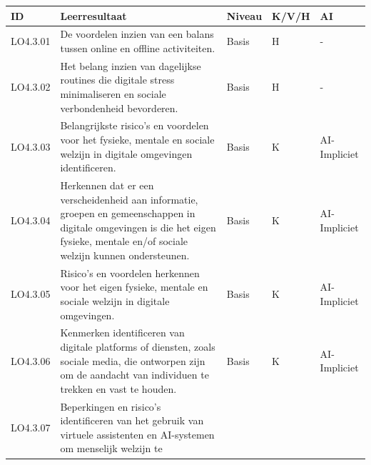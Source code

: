 \documentclass[
  dutch,
  letterpaper,
  DIV=11,
  numbers=noendperiod]{scrartcl}
\begin{document}
\begin{longtable}[]{@{}
  >{\centering\arraybackslash}p{}
  >{\centering\arraybackslash}p{}
  >{\centering\arraybackslash}p{}
  >{\centering\arraybackslash}p{}
  >{\centering\arraybackslash}p{}@{}}
\toprule\noalign{}
\begin{minipage}[b]{\linewidth}\centering
ID
\end{minipage} & \begin{minipage}[b]{\linewidth}\centering
Leerresultaat
\end{minipage} & \begin{minipage}[b]{\linewidth}\centering
Niveau
\end{minipage} & \begin{minipage}[b]{\linewidth}\centering
K/V/H
\end{minipage} & \begin{minipage}[b]{\linewidth}\centering
AI
\end{minipage} \\
\midrule\noalign{}
\endhead
\bottomrule\noalign{}
\endlastfoot
LO4.3.01 & De voordelen inzien van een balans tussen online en offline
activiteiten. & Basis & H & - \\
LO4.3.02 & Het belang inzien van dagelijkse routines die digitale stress
minimaliseren en sociale verbondenheid bevorderen. & Basis & H & - \\
LO4.3.03 & Belangrijkste risico's en voordelen voor het fysieke, mentale
en sociale welzijn in digitale omgevingen identificeren. & Basis & K &
AI-Impliciet \\
LO4.3.04 & Herkennen dat er een verscheidenheid aan informatie, groepen
en gemeenschappen in digitale omgevingen is die het eigen fysieke,
mentale en/of sociale welzijn kunnen ondersteunen. & Basis & K &
AI-Impliciet \\
LO4.3.05 & Risico's en voordelen herkennen voor het eigen fysieke,
mentale en sociale welzijn in digitale omgevingen. & Basis & K &
AI-Impliciet \\
LO4.3.06 & Kenmerken identificeren van digitale platforms of diensten,
zoals sociale media, die ontworpen zijn om de aandacht van individuen te
trekken en vast te houden. & Basis & K & AI-Impliciet \\
LO4.3.07 & Beperkingen en risico's identificeren van het gebruik van
virtuele assistenten en AI-systemen om menselijk welzijn te

\end{longtable}
\end{document}
